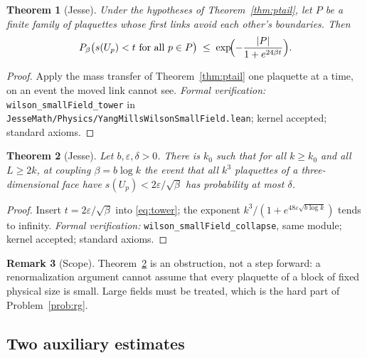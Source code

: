 \documentclass[11pt]{article}
\numberwithin{equation}{subsection}
\theoremstyle{plain}
\newtheorem{theorem}{Theorem}[subsection]
\theoremstyle{definition}
\newtheorem{remark}[theorem]{Remark}
\begin{document}
\begin{theorem}[Jesse]\label{thm:tower}
Under the hypotheses of Theorem~\ref{thm:ptail}, let $P$ be a finite family of plaquettes whose
first links avoid each other's boundaries. Then
\begin{equation}\label{eq:tower}
P_\beta\bigl(s(U_p)<t\text{ for all }p\in P\bigr)\;\le\;\exp\!\Bigl(-\frac{|P|}{1+e^{24\beta t}}\Bigr).
\end{equation}
\end{theorem}
\begin{proof}
Apply the mass transfer of Theorem~\ref{thm:ptail} one plaquette at a time, on an event the
moved link cannot see. \emph{Formal verification:} \texttt{wilson\_\allowbreak{}small\allowbreak{}Field\_\allowbreak{}tower} in
\texttt{Jesse\allowbreak{}Math/\allowbreak{}Physics/\allowbreak{}Yang\allowbreak{}Mills\allowbreak{}Wilson\allowbreak{}Small\allowbreak{}Field.\allowbreak{}lean}; kernel accepted; standard axioms.
\end{proof}

\begin{theorem}[Jesse]\label{thm:collapse}
Let $b,\varepsilon,\delta>0$. There is $k_0$ such that for all $k\ge k_0$ and all $L\ge 2k$, at
coupling $\beta=b\log k$ the event that all $k^3$ plaquettes of a three-dimensional face have
$s(U_p)<2\varepsilon/\sqrt{\beta}$ has probability at most $\delta$.
\end{theorem}
\begin{proof}
Insert $t=2\varepsilon/\sqrt\beta$ into \eqref{eq:tower}; the exponent $k^3/(1+e^{48\varepsilon\sqrt{b\log k}})$
tends to infinity. \emph{Formal verification:} \texttt{wilson\_\allowbreak{}small\allowbreak{}Field\_\allowbreak{}collapse}, same module;
kernel accepted; standard axioms.
\end{proof}

\begin{remark}[Scope]
Theorem~\ref{thm:collapse} is an obstruction, not a step forward: a renormalization argument
cannot assume that every plaquette of a block of fixed physical size is small. Large fields
must be treated, which is the hard part of Problem~\ref{prob:rg}.
\end{remark}

\subsection{Two auxiliary estimates}
\end{document}
